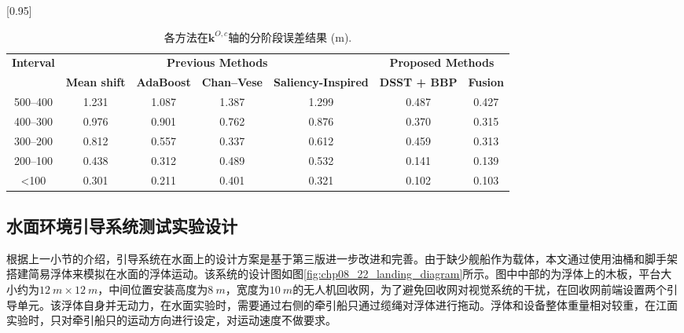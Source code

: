 \begin{table}[H]
	\centering
	\caption{各方法在$\mathbf{k}^{O,c}$轴的分阶段误差结果 (m).}
	\label{lab:algorithms_k}
	\scalebox{0.95}[0.95]{	\begin{tabular}{ccccccc}
			\toprule
			
			\multirow{2}{*}{\textbf{Interval}}\vspace{-2pt}
& \multicolumn{4}{c}{\textbf{Previous Methods}}                               & \multicolumn{2}{c}{\textbf{Proposed Methods}} \\ \cmidrule(lr){2-5} \cmidrule(lr){6-7} 
\multicolumn{1}{l}{} & \textbf{Mean shift}  & \textbf{AdaBoost}  & \textbf{Chan--Vese}  & \multicolumn{1}{c}{\textbf{Saliency-Inspired}} & \textbf{DSST + BBP}   & \textbf{Fusion} \\\midrule
			500--400             & 1.231       & 1.087       & 1.387       & \multicolumn{1}{c}{1.299}          & 0.487       & 0.427       \\
			400--300             & 0.976       & 0.901       & 0.762       & \multicolumn{1}{c}{0.876}          & 0.370       & 0.315       \\
			300--200             & 0.812       & 0.557       & 0.337       & \multicolumn{1}{c}{0.612}          & 0.459       & 0.313       \\
			200--100             & 0.438       & 0.312       & 0.489       & \multicolumn{1}{c}{0.532}          & 0.141       & 0.139       \\
			\textless100          & 0.301       & 0.211       & 0.401       & \multicolumn{1}{c}{0.321}          & 0.102       & 0.103       \\ 
			\bottomrule
	\end{tabular}}
\end{table}

\subsection{水面环境引导系统测试实验设计}
根据上一小节的介绍，引导系统在水面上的设计方案是基于第三版进一步改进和完善。由于缺少舰船作为载体，本文通过使用油桶和脚手架搭建简易浮体来模拟在水面的浮体运动。该系统的设计图如图\ref{fig:chp08_22_landing_diagram}所示。图中中部的为浮体上的木板，平台大小约为$12\ m\times 12\ m$，中间位置安装高度为$8\ m$，宽度为$10\ m$的无人机回收网，为了避免回收网对视觉系统的干扰，在回收网前端设置两个引导单元。该浮体自身并无动力，在水面实验时，需要通过右侧的牵引船只通过缆绳对浮体进行拖动。浮体和设备整体重量相对较重，在江面实验时，只对牵引船只的运动方向进行设定，对运动速度不做要求。

